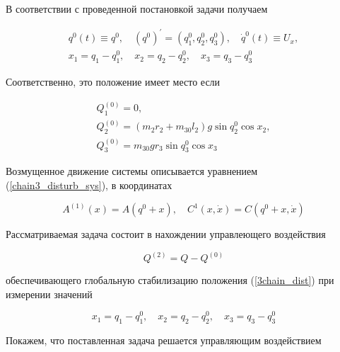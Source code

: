   В соответствии с проведенной постановкой задачи получаем
  
  \begin{equation}
  \begin{array}{l}
   q^{0}(t) \equiv q^{0}, \quad (q^{0})^{'} = (q_1^0, q_2^0, q_3^0), \quad \dot q^{0}(t) \equiv U_x, \\
   x_1 = q_1 - q_1^0, \quad x_2 = q_2 - q_2^0, \quad x_3 = q_3 - q_3^0 \label{3chain_dist}
   \end{array}
   \end{equation}
   
   Соответственно, это положение имеет место если
   
    \begin{equation}
     \begin{array}{l}
     Q_1^{(0)} = 0, \\
     Q_2^{(0)} = (m_2 r_2 + m_{30} l_2)g \sin q_2^0 \cos x_2, \\
     Q_3^{(0)} = m_{30} g r_3 \sin q_3^0 \cos x_3 \label{chain3_control_functions}
     \end{array}
    \end{equation}
    
  Возмущенное движение системы описывается уравнением (\ref{chain3_disturb_sys}), в координатах
  
     \begin{equation}
      A^{(1)}(x) = A(q^0 + x), \quad C^1(x, \dot x) = C(q^0 + x, \dot x)
     \end{equation}
     
  Рассматриваемая задача состоит в нахождении управлеющего воздействия
  
     \begin{equation*}
      Q^{(2)} = Q - Q^{(0)}
     \end{equation*}
     
  обеспечивающего глобальную стабилизацию положения (\ref{3chain_dist}) при измерении значений
  
     \begin{equation*}
     x_1 = q_1 - q_1^0, \quad x_2 = q_2 - q_2^0, \quad x_3 = q_3 - q_3^0
     \end{equation*}
     
  Покажем, что поставленная задача решается управляющим воздействием
  
